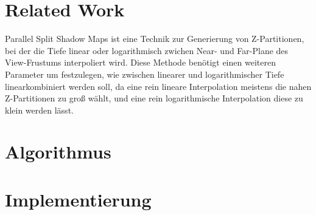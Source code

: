 \documentclass{article}
\begin{document}
\section{Related Work}

Parallel Split Shadow Maps ist eine Technik zur Generierung von Z-Partitionen, bei der die Tiefe linear oder logarithmisch zwichen Near- und Far-Plane des View-Frustums interpoliert wird. Diese Methode benötigt einen weiteren Parameter um festzulegen, wie zwischen linearer und logarithmischer Tiefe linearkombiniert werden soll, da eine rein lineare Interpolation meistens die nahen Z-Partitionen zu groß wählt, und eine rein logarithmische Interpolation diese zu klein werden lässt.


\section{Algorithmus}



\section{Implementierung}
\end{document}
